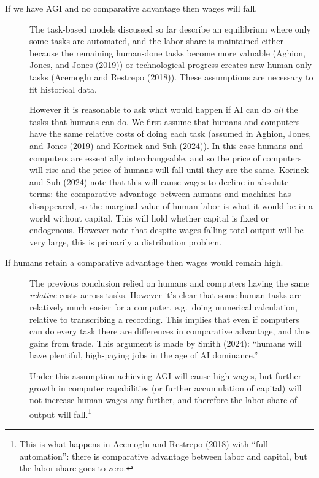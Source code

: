 \documentclass[
  11pt,
  letterpaper,
  DIV=11,
  numbers=noendperiod,
  oneside]{scrartcl}
\begin{document}
\begin{description}
\item[If we have AGI and no comparative advantage then wages will fall.]
The task-based models discussed so far describe an equilibrium where
only some tasks are automated, and the labor share is maintained either
because the remaining human-done tasks become more valuable (Aghion,
Jones, and Jones (2019)) or technological progress creates new
human-only tasks (Acemoglu and Restrepo (2018)). These assumptions are
necessary to fit historical data.

However it is reasonable to ask what would happen if AI can do
\emph{all} the tasks that humans can do. We first assume that humans and
computers have the same relative costs of doing each task (assumed in
Aghion, Jones, and Jones (2019) and Korinek and Suh (2024)). In this
case humans and computers are essentially interchangeable, and so the
price of computers will rise and the price of humans will fall until
they are the same. Korinek and Suh (2024) note that this will cause
wages to decline in absolute terms: the comparative advantage between
humans and machines has disappeared, so the marginal value of human
labor is what it would be in a world without capital. This will hold
whether capital is fixed or endogenous. However note that despite wages
falling total output will be very large, this is primarily a
distribution problem.
\end{description}

\begin{description}
\item[If humans retain a comparative advantage then wages would remain
high.]
The previous conclusion relied on humans and computers having the same
\emph{relative} costs across tasks. However it's clear that some human
tasks are relatively much easier for a computer, e.g.~doing numerical
calculation, relative to transcribing a recording. This implies that
even if computers can do every task there are differences in comparative
advantage, and thus gains from trade. This argument is made by Smith
(2024): ``humans will have plentiful, high-paying jobs in the age of AI
dominance.''

Under this assumption achieving AGI will cause high wages, but further
growth in computer capabilities (or further accumulation of capital)
will not increase human wages any further, and therefore the labor share
of output will fall.\footnote{This is what happens in Acemoglu and
  Restrepo (2018) with ``full automation'': there is comparative
  advantage between labor and capital, but the labor share goes to zero.}
\end{description}
\end{document}
